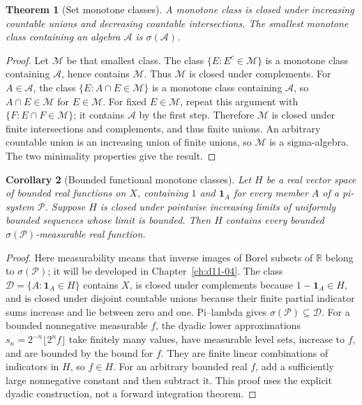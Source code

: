 \documentclass[11pt,oneside,openany]{book}
\newtheorem{theorem}{Theorem}[chapter]
\newtheorem{corollary}[theorem]{Corollary}
\theoremstyle{definition}
\theoremstyle{remark}
\newcommand{\R}{\mathbb R}\newcommand{\C}{\mathbb C}
\newcommand{\calA}{\mathcal A}\newcommand{\LL}{\mathcal L}
\newcommand{\one}{\mathbf1}\newcommand{\ind}[1]{\mathbf1_{#1}}
\newcommand{\family}[1]{}
\begin{document}
\begin{theorem}[Set monotone classes]
\family{D11.01.monotone_class}\label{d11:01:monotone-class}
A monotone class is closed under increasing countable unions and decreasing
countable intersections. The smallest monotone class containing an algebra
$\calA$ is $\sigma(\calA)$.
\end{theorem}
\begin{proof}
Let $\mathcal M$ be that smallest class. The class
$\{E:E^c\in\mathcal M\}$ is a monotone class containing $\calA$, hence
contains $\mathcal M$. Thus $\mathcal M$ is closed under complements.
For $A\in\calA$, the class $\{E:A\cap E\in\mathcal M\}$ is a monotone
class containing $\calA$, so $A\cap E\in\mathcal M$ for $E\in\mathcal M$.
For fixed $E\in\mathcal M$, repeat this argument with
$\{F:E\cap F\in\mathcal M\}$; it contains $\calA$ by the first step.
Therefore $\mathcal M$ is closed under finite intersections and complements,
and thus finite unions. An arbitrary countable union is an increasing union
of finite unions, so $\mathcal M$ is a sigma-algebra. The two minimality
properties give the result.
\end{proof}

\begin{corollary}[Bounded functional monotone classes]
\family{D11.01.functional_monotone_class}\label{d11:01:functional-monotone-class}
Let $H$ be a real vector space of bounded real functions on $X$, containing
$1$ and $\one_A$ for every member $A$ of a pi-system $\mathcal P$.
Suppose $H$ is closed under pointwise increasing limits of uniformly bounded
sequences whose limit is bounded. Then $H$ contains every bounded
$\sigma(\mathcal P)$-measurable real function.
\end{corollary}
\begin{proof}
Here measurability means that inverse images of Borel subsets of $\R$ belong
to $\sigma(\mathcal P)$; it will be developed in Chapter~\ref{ch:d11-04}.
The class $\mathcal D=\{A:\one_A\in H\}$ contains $X$, is closed under
complements because $1-\one_A\in H$, and is closed under disjoint countable
unions because their finite partial indicator sums increase and lie between
zero and one. Pi--lambda gives $\sigma(\mathcal P)\subseteq\mathcal D$.
For a bounded nonnegative measurable $f$, the dyadic lower approximations
$s_n=2^{-n}\lfloor2^nf\rfloor$ take finitely many values, have measurable
level sets, increase to $f$, and are bounded by the bound for $f$.
They are finite linear combinations of indicators in $H$, so $f\in H$.
For an arbitrary bounded real $f$, add a sufficiently large nonnegative
constant and then subtract it. This proof uses the explicit dyadic construction,
not a forward integration theorem.
\end{proof}
\end{document}

